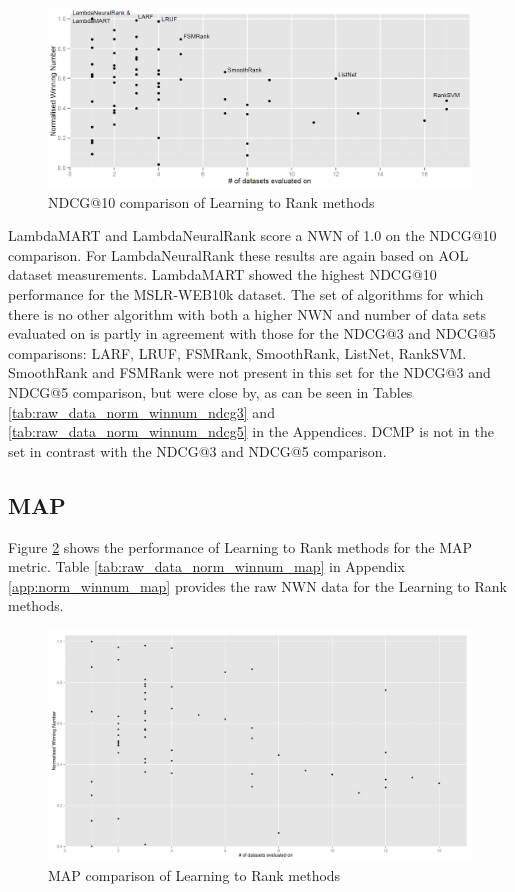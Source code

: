 \begin{figure}[!h]
\includegraphics[scale=0.285]{gfx/ndcg10_winnum}
\caption{\acs{NDCG}@10 comparison of Learning to Rank methods}
\label{fig:normalised_winning_number_NDCG10}
\end{figure}

LambdaMART and LambdaNeuralRank score a \ac{NWN} of 1.0 on the \ac{NDCG}@10 comparison. For LambdaNeuralRank these results are again based on AOL dataset measurements. LambdaMART showed the highest \ac{NDCG}@10 performance for the MSLR-WEB10k dataset. The set of algorithms for which there is no other algorithm with both a higher \ac{NWN} and number of data sets evaluated on is partly in agreement with those for the \ac{NDCG}@3 and \ac{NDCG}@5 comparisons: {LARF, LRUF, FSMRank, SmoothRank, ListNet, RankSVM}. SmoothRank and FSMRank were not present in this set for the \ac{NDCG}@3 and \ac{NDCG}@5 comparison, but were close by, as can be seen in Tables \ref{tab:raw_data_norm_winnum_ndcg3} and \ref{tab:raw_data_norm_winnum_ndcg5} in the Appendices. DCMP is not in the set in contrast with the \ac{NDCG}@3 and \ac{NDCG}@5 comparison.

\subsection{MAP}
Figure \ref{fig:normalised_winning_number_map} shows the performance of Learning to Rank methods for the \ac{MAP} metric. Table \ref{tab:raw_data_norm_winnum_map} in Appendix \ref{app:norm_winnum_map} provides the raw \ac{NWN} data for the Learning to Rank methods.\\

\begin{figure}[!h]
\includegraphics[scale=0.285]{gfx/map_winnum}
\caption{\acs{MAP} comparison of Learning to Rank methods}
\label{fig:normalised_winning_number_map}
\end{figure}


